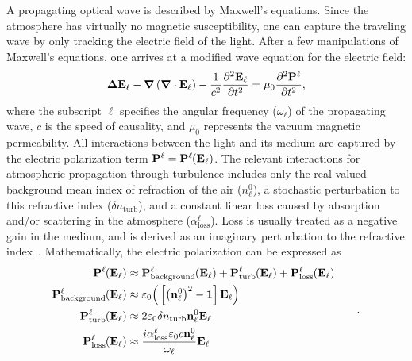 \documentclass[9pt,twocolumn,twoside]{osajnl}
\newcommand{\la}[1]{\label{#1}}
\newcommand{\ppn}[3]{\frac{\partial^{#1} #2}{\partial #3^{#1}}}
\newcommand{\LO}[1]{\boldsymbol\Delta #1}
\newcommand{\bfnabla}{\boldsymbol\nabla}
\begin{document}
A propagating optical wave is described by Maxwell's equations.  
Since the atmosphere has virtually no magnetic susceptibility, one can 
capture the traveling wave by only tracking the electric field of the light.  
After a few manipulations of Maxwell's equations, one arrives at a modified wave 
equation for the electric field:  
\begin{equation}\la{equ:ModifiedWaveEquation}
	\LO{{\bf E}_{\ell}} - \bfnabla\left( \bfnabla \cdot {\bf E}_{\ell} \right) 
- \frac{1}{c^{2}}\ppn{2}{{\bf E}_{\ell}}{t} = \mu_{0} \ppn{2}{{\bf 
P}^{\ell}}{t},
\end{equation}
where the subscript $\ell$ specifies the angular frequency 
($\omega_{\ell}$) of the propagating wave, $c$ is the speed of causality, and 
$\mu_{0}$ represents the vacuum magnetic permeability.  
All interactions between the light and its medium are captured by the 
electric polarization term ${\bf P}^{\ell} = {\bf 
P}^{\ell}\hspace{-0.03in}\left( {\bf E}_{\ell} \right)$.  
The relevant interactions for atmospheric propagation through turbulence 
includes only the real-valued background mean index of refraction of the air 
($n_{\ell}^{0}$), a stochastic perturbation to this refractive index 
($\delta n_{\text{turb}}$), and a constant linear loss caused by absorption 
and/or scattering in the atmosphere ($\alpha_{\text{loss}}^{\ell}$).  
Loss is usually treated as a negative gain in the medium, and is derived as an 
imaginary perturbation to the refractive index~\cite{nagaraj20193d}.  
Mathematically, the electric polarization can be expressed as
\begin{equation*}
\begin{aligned}
{\bf P}^{\ell}\hspace{-0.03in}\left( {\bf E}_{\ell} \right) & \approx 
{\bf P}_{\text{background}}^{\ell}\hspace{-0.03in}\left( {\bf E}_{\ell} \right) 
+ {\bf P}_{\text{turb}}^{\ell}\hspace{-0.03in}\left( {\bf E}_{\ell} \right) + {\bf P}_{\text{loss}}^{\ell}\hspace{-0.03in}\left( {\bf E}_{\ell} \right) \\
{\bf P}_{\text{background}}^{\ell}\hspace{-0.03in}\left( {\bf 
E}_{\ell} \right) & \approx \varepsilon_{0} \Big( \left[ \big( {\bf 
n}_{\ell}^{0} \big)^{2} - {\bf 1} \right]{\bf E}_{\ell} \Big) \\
{\bf P}_{\text{turb}}^{\ell}\hspace{-0.03in}\left( {\bf E}_{\ell} 
\right) & \approx 2 \varepsilon_{0} \delta n_{\text{turb}} {\bf n}_{\ell}^{0}{\bf 
E}_{\ell} \\
{\bf P}_{\text{loss}}^{\ell}\hspace{-0.03in}\left( {\bf E}_{\ell} \right) & \approx \frac{i\alpha_{\text{loss}}^{\ell}\varepsilon_{0}c{\bf n}_{\ell}^{0}}{\omega_{\ell}}{\bf E}_{\ell}
\end{aligned} \quad \quad .
\end{equation*}
\end{document}
